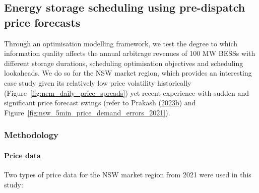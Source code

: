 \documentclass[12pt,a4paper,]{report}
\begin{document}
\hypertarget{sec:info-case_study-bess_simulations}{%
\subsection{Energy storage scheduling using pre-dispatch price
forecasts}\label{sec:info-case_study-bess_simulations}}

Through an optimisation modelling framework, we test the degree to which
information quality affects the annual arbitrage revenues of 100 MW
BESSs with different storage durations, scheduling optimisation
objectives and scheduling lookaheads. We do so for the NSW market
region, which provides an interesting case study given its relatively
low price volatility historically
(Figure~\ref{fig:nem_daily_price_spreads}) yet recent experience with
sudden and significant price forecast swings (refer to Prakash
(\protect\hyperlink{ref-prakashEnergyPriceConvergence2023}{2023b}) and
Figure~\ref{fig:nsw_5min_price_demand_errors_2021}).

\hypertarget{sec:info-case_study-bess_simulations-method}{%
\subsubsection{Methodology}\label{sec:info-case_study-bess_simulations-method}}

\hypertarget{sec:info-case_study-bess_simulations-method-price_data}{%
\paragraph{Price
data}\label{sec:info-case_study-bess_simulations-method-price_data}}

Two types of price data for the NSW market region from 2021 were used in
this study:
\end{document}
